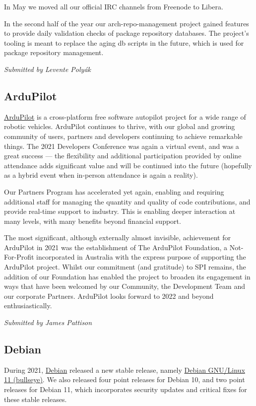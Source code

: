 \documentclass[a4paper]{report}
\begin{document}
In May we moved all our official IRC channels from Freenode to Libera.

In the second half of the year our arch-repo-management project gained features to provide daily validation checks of package repository databases.  The project’s tooling is meant to replace the aging db scripts in the future, which is used for package repository management.

{\em Submitted by Levente Polyák}

\subsection{ArduPilot}

\href{https://ardupilot.org/}{ArduPilot} is a cross-platform free software autopilot project for a wide range of robotic vehicles. ArduPilot continues to thrive, with our global and growing community of users, partners and developers continuing to achieve remarkable things. The 2021 Developers Conference was again a virtual event, and was a great success --- the flexibility and additional participation provided by online attendance adds significant value and will be continued into the future (hopefully as a hybrid event when in-person attendance is again a reality).

Our Partners Program has accelerated yet again, enabling and requiring additional staff for managing the quantity and quality of code contributions, and provide real-time support to industry. This is enabling deeper interaction at many levels, with many benefits beyond financial support.

The most significant, although externally almost invisible, achievement for ArduPilot in 2021 was the establishment of The ArduPilot Foundation, a Not-For-Profit incorporated in Australia with the express purpose of supporting the ArduPilot project.  Whilst our commitment (and gratitude) to SPI remains, the addition of our Foundation has enabled the project to broaden its engagement in ways that have been welcomed by our Community, the Development Team and our corporate Partners.  ArduPilot looks forward to 2022 and beyond enthusiastically.

{\em Submitted by James Pattison}

\subsection{Debian}

During 2021, \href{https://debian.org/}{Debian} released a new stable release, namely \href{https://www.debian.org/News/2021/20210814}{Debian GNU/Linux 11 (bullseye)}. We also released four point releases for Debian 10, and two point releases for Debian 11, which incorporates security updates and critical fixes for these stable releases.
\end{document}
